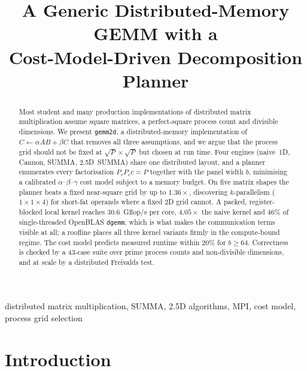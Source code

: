 \documentclass[conference,10pt]{IEEEtran}
\begin{document}
\title{A Generic Distributed-Memory GEMM with a\\
       Cost-Model-Driven Decomposition Planner}

\author{
}

\maketitle

\begin{abstract}
Most student and many production implementations of distributed matrix
multiplication assume square matrices, a perfect-square process count and
divisible dimensions. We present \texttt{gemm2d}, a distributed-memory
implementation of $C \leftarrow \alpha AB + \beta C$ that removes all three
assumptions, and we argue that the process grid should not be fixed at
$\sqrt{P}\times\sqrt{P}$ but chosen at run time. Four engines (naive~1D,
Cannon, SUMMA, 2.5D~SUMMA) share one distributed layout, and a planner
enumerates every factorisation $P_r P_c c = P$ together with the panel width
$b$, minimising a calibrated $\alpha$--$\beta$--$\gamma$ cost model subject to
a memory budget. On five matrix shapes the planner beats a fixed near-square
grid by up to $1.36\times$, discovering $k$-parallelism ($1\!\times\!1\!\times\!4$)
for short-fat operands where a fixed 2D grid cannot. A packed,
register-blocked local kernel reaches $30.6$~Gflop/s per core, $4.05\times$
the naive kernel and $46\%$ of single-threaded OpenBLAS \texttt{dgemm}, which is
what makes the communication terms visible at all; a roofline places all three
kernel variants firmly in the compute-bound regime. The cost model predicts
measured runtime within $20\%$ for $b\ge64$. Correctness is checked by a
43-case suite over prime process counts and non-divisible dimensions, and at
scale by a distributed Freivalds test.
\end{abstract}

\begin{IEEEkeywords}
distributed matrix multiplication, SUMMA, 2.5D algorithms, MPI, cost model,
process grid selection
\end{IEEEkeywords}

\section{Introduction}
\end{document}
